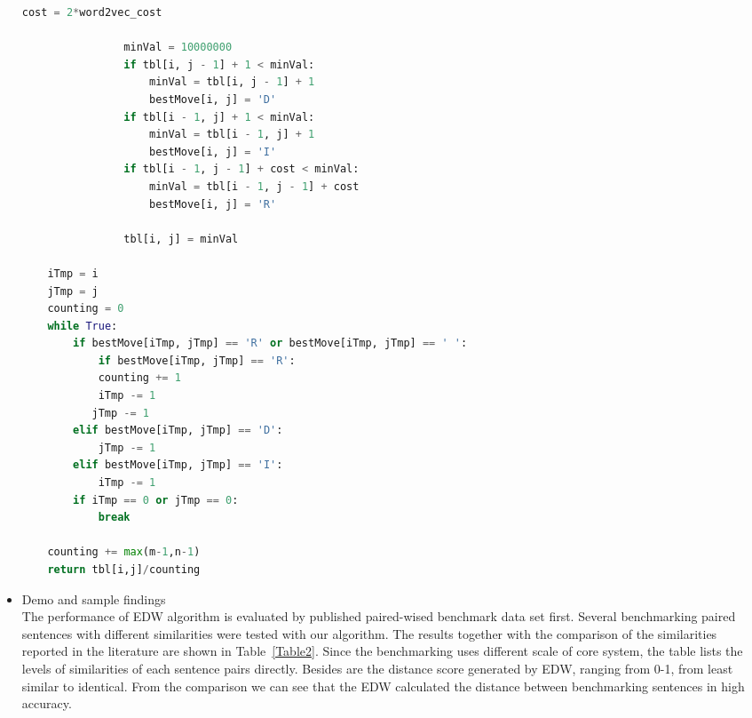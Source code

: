 \documentclass[10pt]{article}
\begin{document}
\begin{itemize}
\begin{lstlisting}[language=Python]
                cost = 2*word2vec_cost

                minVal = 10000000
                if tbl[i, j - 1] + 1 < minVal:
                    minVal = tbl[i, j - 1] + 1
                    bestMove[i, j] = 'D'
                if tbl[i - 1, j] + 1 < minVal:
                    minVal = tbl[i - 1, j] + 1
                    bestMove[i, j] = 'I'
                if tbl[i - 1, j - 1] + cost < minVal:
                    minVal = tbl[i - 1, j - 1] + cost
                    bestMove[i, j] = 'R'

                tbl[i, j] = minVal

    iTmp = i
    jTmp = j
    counting = 0
    while True:
        if bestMove[iTmp, jTmp] == 'R' or bestMove[iTmp, jTmp] == ' ':
            if bestMove[iTmp, jTmp] == 'R':
            counting += 1
            iTmp -= 1
           jTmp -= 1
        elif bestMove[iTmp, jTmp] == 'D':
            jTmp -= 1
        elif bestMove[iTmp, jTmp] == 'I':
            iTmp -= 1
        if iTmp == 0 or jTmp == 0:
            break

    counting += max(m-1,n-1)
    return tbl[i,j]/counting

\end{lstlisting}


\item{}
Demo and sample findings\\
The performance of EDW algorithm is evaluated by published paired-wised benchmark data set \cite{O'shea:2014:NBD:2560566.2537046}  first. Several benchmarking paired sentences with different similarities were tested with our algorithm. The results together with the comparison of the similarities reported in the literature are shown in Table~\ref{Table2}. Since the benchmarking uses different scale of core system, the table lists the levels of similarities of each sentence pairs directly. Besides are the distance score generated by EDW, ranging from 0-1, from least similar to identical. From the comparison we can see that the EDW calculated the distance between benchmarking sentences in high accuracy. \\\\


\end{itemize}
\end{document}

